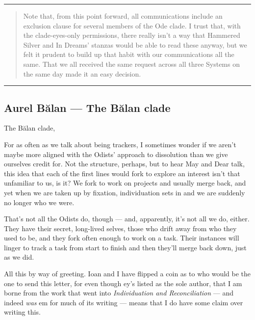 \null
\vfill
\begin{center}\rule{0.5\linewidth}{0.5pt}\end{center}

\begin{quote}
Note that, from this point forward, all communications include an exclusion clause for several members of the Ode clade. I trust that, with the clade-eyes-only permissions, there really isn't a way that Hammered Silver and In Dreams' stanzas would be able to read these anyway, but we felt it prudent to build up that habit with our communications all the same. That we all received the same request across all three Systems on the same day made it an easy decision.
\end{quote}

\begin{center}\rule{0.5\linewidth}{0.5pt}\end{center}
\vfill
\pagebreak


\hypertarget{aurel-bux103lan-the-bux103lan-clade}{%
\subsection{Aurel Bălan — The Bălan clade}\label{aurel-bux103lan-the-bux103lan-clade}}

The Bălan clade,

For as often as we talk about being trackers, I sometimes wonder if we aren't maybe more aligned with the Odists' approach to dissolution than we give ourselves credit for. Not the structure, perhaps, but to hear May and Dear talk, this idea that each of the first lines would fork to explore an interest isn't that unfamiliar to us, is it? We fork to work on projects and usually merge back, and yet when we are taken up by fixation, individuation sets in and we are suddenly no longer who we were.

That's not all the Odists do, though — and, apparently, it's not all we do, either. They have their secret, long-lived selves, those who drift away from who they used to be, and they fork often enough to work on a task. Their instances will linger to track a task from start to finish and then they'll merge back down, just as we did.

All this by way of greeting. Ioan and I have flipped a coin as to who would be the one to send this letter, for even though ey's listed as the sole author, that I am borne from the work that went into \emph{Individuation and Reconciliation} — and indeed \emph{was} em for much of its writing — means that I do have some claim over writing this.

